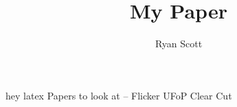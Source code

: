\documentclass[10pt, sigconf,anonymous]{acmart}
\title{My Paper}
\author{Ryan Scott}
\begin{document}
  hey latex
  Papers to look at --
  Flicker
  UFoP
  Clear Cut \cite{cleancut}


\end{document}
